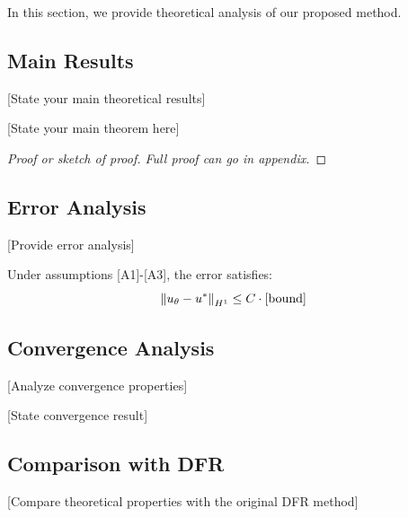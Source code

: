 
In this section, we provide theoretical analysis of our proposed method.

\subsection{Main Results}

[State your main theoretical results]

\begin{theorem}
\label{thm:main}
[State your main theorem here]
\end{theorem}

\begin{proof}
[Proof or sketch of proof. Full proof can go in appendix]
\end{proof}

\subsection{Error Analysis}

[Provide error analysis]

\begin{proposition}
\label{prop:error}
Under assumptions [A1]-[A3], the error satisfies:
\begin{equation}
    \left\|u_\theta - u^*\right\|_{H^1} \leq C \cdot \text{[bound]}
\end{equation}
\end{proposition}

\subsection{Convergence Analysis}

[Analyze convergence properties]

\begin{theorem}[Convergence]
\label{thm:convergence}
[State convergence result]
\end{theorem}

\subsection{Comparison with DFR}

[Compare theoretical properties with the original DFR method]

\begin{remark}
\end{remark}
